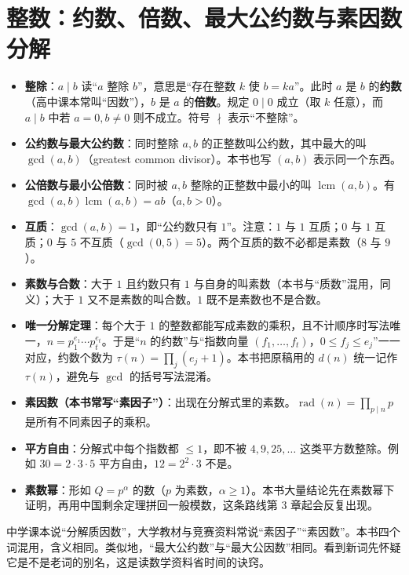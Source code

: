 \documentclass[UTF8,a4paper,11pt,twoside,openright,fontset=fandol]{ctexbook}
\theoremstyle{definition}
\newcommand{\lcm}{\operatorname{lcm}}
\newcommand{\rad}{\operatorname{rad}}
\begin{document}
\section{整数：约数、倍数、最大公约数与素因数分解}
\begin{itemize}
\item \textbf{整除}：$a\mid b$ 读“$a$ 整除 $b$”，意思是“存在整数 $k$ 使 $b=ka$”。此时 $a$ 是 $b$ 的\textbf{约数}（高中课本常叫“因数”），$b$ 是 $a$ 的\textbf{倍数}。规定 $0\mid 0$ 成立（取 $k$ 任意），而 $a\mid b$ 中若 $a=0,b\ne0$ 则不成立。符号 $\nmid$ 表示“不整除”。
\item \textbf{公约数与最大公约数}：同时整除 $a,b$ 的正整数叫公约数，其中最大的叫 $\gcd(a,b)$（greatest common divisor）。本书也写 $(a,b)$ 表示同一个东西。
\item \textbf{公倍数与最小公倍数}：同时被 $a,b$ 整除的正整数中最小的叫 $\lcm(a,b)$。有 $\gcd(a,b)\lcm(a,b)=ab$（$a,b>0$）。
\item \textbf{互质}：$\gcd(a,b)=1$，即“公约数只有 $1$”。注意：$1$ 与 $1$ 互质；$0$ 与 $1$ 互质；$0$ 与 $5$ 不互质（$\gcd(0,5)=5$）。两个互质的数不必都是素数（$8$ 与 $9$）。
\item \textbf{素数与合数}：大于 $1$ 且约数只有 $1$ 与自身的叫素数（本书与“质数”混用，同义）；大于 $1$ 又不是素数的叫合数。$1$ 既不是素数也不是合数。
\item \textbf{唯一分解定理}：每个大于 $1$ 的整数都能写成素数的乘积，且不计顺序时写法唯一，$n=p_1^{e_1}\cdots p_t^{e_t}$。于是“$n$ 的约数”与“指数向量 $(f_1,\ldots,f_t)$，$0\le f_j\le e_j$”一一对应，约数个数为
$\tau(n)=\prod_j(e_j+1)$。本书把原稿用的 $d(n)$ 统一记作 $\tau(n)$，避免与 $\gcd$ 的括号写法混淆。
\item \textbf{素因数（本书常写“素因子”）}：出现在分解式里的素数。$\rad(n)=\prod_{p\mid n}p$ 是所有不同素因子的乘积。
\item \textbf{平方自由}：分解式中每个指数都 $\le1$，即不被 $4,9,25,\ldots$ 这类平方数整除。例如 $30=2\cdot3\cdot5$ 平方自由，$12=2^2\cdot3$ 不是。
\item \textbf{素数幂}：形如 $Q=p^\alpha$ 的数（$p$ 为素数，$\alpha\ge1$）。本书大量结论先在素数幂下证明，再用中国剩余定理拼回一般模数，这条路线第 3 章起会反复出现。
\end{itemize}

\begin{tip}
中学课本说“分解质因数”，大学教材与竞赛资料常说“素因子”“素因数”。本书四个词混用，含义相同。类似地，“最大公约数”与“最大公因数”相同。看到新词先怀疑它是不是老词的别名，这是读数学资料省时间的诀窍。
\end{tip}
\end{document}

